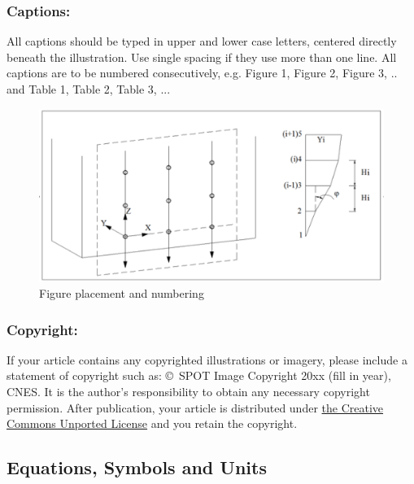 \documentclass{isprs} %
\begin{document}
\subsubsection{Captions:}\label{sec:Captions}

All captions should be typed in upper and lower case letters, 
centered directly beneath the illustration. Use single spacing if they 
use more than one line. All captions are to be numbered consecutively, 
e.g. Figure 1, Figure 2, Figure 3, ..  and Table 1, Table 2, Table 3, ...

\begin{figure}[ht!]
\begin{center}
		\includegraphics[width=1.0\columnwidth]{figures/test_sites/fig1.eps}
	\caption{Figure placement and numbering}
\label{fig:figure_placement}
\end{center}
\end{figure}


\subsubsection{Copyright:}\label{sec:Copyright}

If your article contains any copyrighted illustrations or imagery, 
please include a statement of copyright such as: \copyright~SPOT Image Copyright 20xx 
(fill in year), CNES\@. It is the author's responsibility to obtain any necessary 
copyright permission. After publication, your article is distributed under \underline{the Creative 
Commons Unported License} and you retain the copyright.


\subsection{Equations, Symbols and Units}\label{sec:Equations, Symbols and Units}
\end{document}
